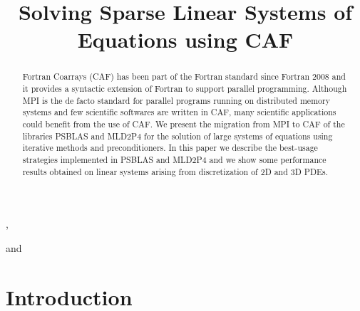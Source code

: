 \documentclass{IOS-Book-Article}
\def\hb{\hbox to 10.7 cm{}}
\begin{document}
\pagestyle{headings}
\def\thepage{}

\begin{frontmatter}              %


\title{Solving Sparse Linear Systems of Equations using CAF}


\author[A]{ %
},
\author[A]{ }
and
\author[B]{ }

\address[A]{University of Rome Tor Vergata}
\address[B]{Cranfield University}

\begin{abstract}
Fortran Coarrays (CAF) has been part of the Fortran standard since Fortran 2008 and it provides a syntactic extension of Fortran to support parallel programming.
Although MPI is the de facto standard for parallel programs running on distributed memory systems and few scientific softwares are written in CAF, many scientific applications could benefit from the use of CAF. 
We present the migration from MPI to CAF of the libraries PSBLAS  and MLD2P4 for the solution of large systems of equations using iterative methods and preconditioners. 
In this paper we describe the best-usage strategies implemented in PSBLAS and MLD2P4 and we show some performance results obtained on linear systems arising from discretization of 2D and 3D PDEs.  
\end{abstract}

\begin{keyword}
\end{keyword}
\end{frontmatter}



\section{Introduction}
\end{document}
